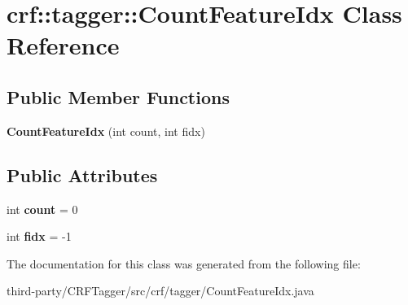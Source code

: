 \hypertarget{classcrf_1_1tagger_1_1CountFeatureIdx}{
\section{crf::tagger::CountFeatureIdx Class Reference}
\label{classcrf_1_1tagger_1_1CountFeatureIdx}
}
\subsection*{Public Member Functions}
\begin{DoxyCompactItemize}
\item 
\hypertarget{classcrf_1_1tagger_1_1CountFeatureIdx_a72b231d16b17a544d4d45a9cefb3a6f0}{
{\bfseries CountFeatureIdx} (int count, int fidx)}
\label{classcrf_1_1tagger_1_1CountFeatureIdx_a72b231d16b17a544d4d45a9cefb3a6f0}

\end{DoxyCompactItemize}
\subsection*{Public Attributes}
\begin{DoxyCompactItemize}
\item 
\hypertarget{classcrf_1_1tagger_1_1CountFeatureIdx_a38d91800d16c564b1ec4ec5a1f39cfbe}{
int {\bfseries count} = 0}
\label{classcrf_1_1tagger_1_1CountFeatureIdx_a38d91800d16c564b1ec4ec5a1f39cfbe}

\item 
\hypertarget{classcrf_1_1tagger_1_1CountFeatureIdx_ac6ab69434356959406e3c4564cd47274}{
int {\bfseries fidx} = -\/1}
\label{classcrf_1_1tagger_1_1CountFeatureIdx_ac6ab69434356959406e3c4564cd47274}

\end{DoxyCompactItemize}


The documentation for this class was generated from the following file:\begin{DoxyCompactItemize}
\item 
third-\/party/CRFTagger/src/crf/tagger/CountFeatureIdx.java\end{DoxyCompactItemize}
